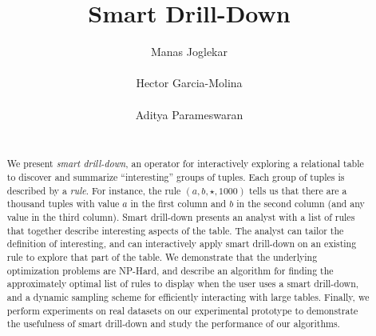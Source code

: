 \documentclass{sig-alternate}
\newcounter{prob}
\newcommand{\papertext}[1]{#1}
\newcommand{\techreporttext}[1]{}
\begin{document}
\title{Smart Drill-Down}
\author{
\alignauthor
Manas Joglekar\\
       \\
\alignauthor
Hector Garcia-Molina\\
       \\
\alignauthor 
Aditya Parameswaran\\
       \\
}
\maketitle

\begin{abstract}
We present {\em smart drill-down},
an operator for interactively exploring a relational table
to discover and summarize ``interesting'' groups of tuples.
Each group of tuples is described by a {\em rule}.
For instance, the rule $(a, b, \star, 1000)$ tells us that
there are a thousand tuples with value $a$ in the first column and $b$
in the second column (and any value in the third column).
Smart drill-down presents an analyst with a list of rules that
together describe interesting aspects of the table.
The analyst can tailor the definition of interesting,
and can interactively apply smart drill-down on an existing rule to
explore that part of the table.
We demonstrate that the underlying optimization problems 
are {\sc NP-Hard}, and describe an
algorithm for finding the approximately optimal list of rules to display when the user uses a smart drill-down, and a dynamic sampling scheme for efficiently interacting with large tables. Finally, we
perform experiments on real datasets on our experimental prototype to demonstrate the usefulness of smart drill-down and study the performance of our algorithms.
\end{abstract}









\techreporttext{}

\papertext{\vspace{-5pt}}




{\small

  
}


\techreporttext{}
\end{document}
